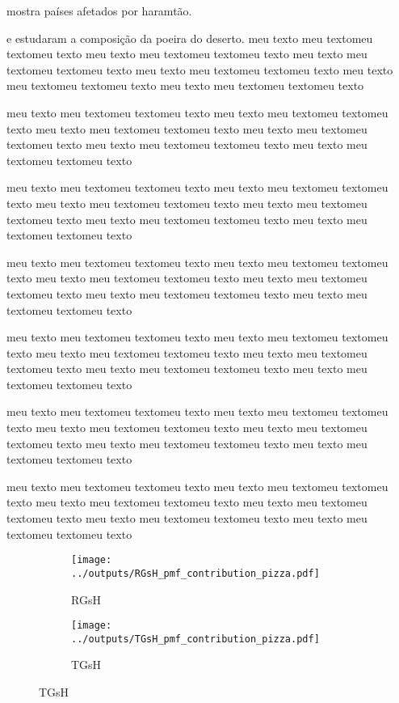 \cite{kaku2016}


\cite{prospero2002} mostra países afetados por haramtão. 

\cite{engelbrecht2009a} e \cite{engelbrecht2009b} estudaram a composição 
da poeira do deserto.
 meu texto meu textomeu textomeu texto meu texto meu textomeu textomeu texto meu texto meu textomeu textomeu texto meu texto meu textomeu textomeu texto meu texto meu textomeu textomeu texto meu texto meu textomeu textomeu texto

 meu texto meu textomeu textomeu texto meu texto meu textomeu textomeu texto meu texto meu textomeu textomeu texto meu texto meu textomeu textomeu texto meu texto meu textomeu textomeu texto meu texto meu textomeu textomeu texto

 meu texto meu textomeu textomeu texto meu texto meu textomeu textomeu texto meu texto meu textomeu textomeu texto meu texto meu textomeu textomeu texto meu texto meu textomeu textomeu texto meu texto meu textomeu textomeu texto


 meu texto meu textomeu textomeu texto meu texto meu textomeu textomeu texto meu texto meu textomeu textomeu texto meu texto meu textomeu textomeu texto meu texto meu textomeu textomeu texto meu texto meu textomeu textomeu texto

 meu texto meu textomeu textomeu texto meu texto meu textomeu textomeu texto meu texto meu textomeu textomeu texto meu texto meu textomeu textomeu texto meu texto meu textomeu textomeu texto meu texto meu textomeu textomeu texto

 meu texto meu textomeu textomeu texto meu texto meu textomeu textomeu texto meu texto meu textomeu textomeu texto meu texto meu textomeu textomeu texto meu texto meu textomeu textomeu texto meu texto meu textomeu textomeu texto

 meu texto meu textomeu textomeu texto meu texto meu textomeu textomeu texto meu texto meu textomeu textomeu texto meu texto meu textomeu textomeu texto meu texto meu textomeu textomeu texto meu texto meu textomeu textomeu texto

\begin{figure}[H]
  \caption{Contribuição das espécie nos Fatores para $MP_{2,5-10}$
  \label{figure:grosso_pmf_contribution_pizza}}
  \begin{subfigure}[b]{0.5\textwidth}
    \texttt{[image: ../outputs/RGsH\_pmf\_contribution\_pizza.pdf]}
    \caption{RGsH}
  \end{subfigure}%
  \begin{subfigure}[b]{0.5\textwidth}
    \texttt{[image: ../outputs/TGsH\_pmf\_contribution\_pizza.pdf]}
    \caption{TGsH}
  \end{subfigure}
\end{figure}

